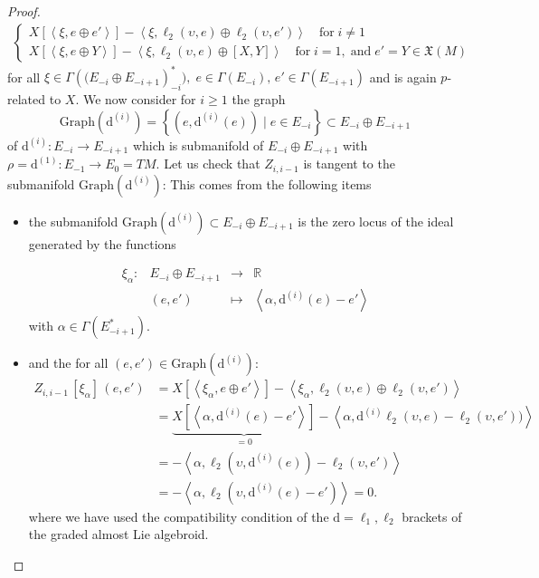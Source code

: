 \documentclass[10pt]{article}
\theoremstyle{plain}
\theoremstyle{definition}
\theoremstyle{remark}
\newcommand{\dd}{\mathrm{d}}
\begin{document}
\begin{proof}
\begin{align*}
\begin{cases}
        X[\left\langle \xi ,e\oplus e'\right\rangle]-\left\langle \xi, \ell_{2}(\upsilon,e)\oplus \ell_{2}(\upsilon,e') \right\rangle\quad \text{for}\; i\neq 1\\ X[\left\langle \xi ,e\oplus Y\right\rangle]-\left\langle \xi, \ell_{2}(\upsilon,e)\oplus [X,Y] \right\rangle\quad \text{for}\; i= 1, \; \text{and}\; e'=Y\in\mathfrak X(M)
    \end{cases}
 \end{align*}for all $\xi\in \Gamma\left((E_{-i}\oplus E_{-i+1}\right)^*_{-i}),\;e\in\Gamma(E_{-i}),\, e'\in\Gamma(E_{-i+1})$ and is again $p$-related to $X$. We now consider for $i\geq 1$ the graph $$\mathrm{Graph}(\dd^{(i)})=\displaystyle{\left\{\left(e, \dd^{(i)}(e)\right) \mid e \in E_{-i}\right\} \subset E_{-i} \oplus E_{-i+1}}$$ of $\dd^{(i)} \colon E_{-i}\to E_{-i+1}$ which is  submanifold of $E_{-i} \oplus E_{-i+1}$ with $\rho=\dd^{(1)}\colon E_{-1}\to E_0=TM$. Let us check that $Z_{i,i-1}$ is tangent to the submanifold $\mathrm{Graph}(\dd^{(i)})$:  This comes from the following items 
\begin{itemize}
     \item[-]  the submanifold $\mathrm{Graph}(\dd^{(i)})\subset E_{-i} \oplus E_{-i+1}$ is the zero locus of the ideal generated by the functions

 $$\begin{array}{rrcl} \xi_\alpha \colon & E_{-i} \oplus E_{-i+1} & \to &  \mathbb R \\& (e,e') & \mapsto & \left\langle\alpha, \dd^{(i)}(e)-e'\right\rangle  \end{array}
 $$
with $ \alpha \in \Gamma(E_{-i+1}^*)$.
     \item[-]  and the for all $(e,e')\in \mathrm{Graph}(\dd^{(i)})$:
 \begin{align*}\nonumber
     Z_{i,i-1}\, [\xi_\alpha ] \, (e,e')&=X[\left\langle \xi_\alpha ,e\oplus e'\right\rangle]-\left\langle \xi_\alpha, \ell_{2}(\upsilon,e)\oplus \ell_{2}(\upsilon,e') \right\rangle\\ &=\underbrace{X[\left\langle \alpha, \dd^{(i)}(e)-e'\right\rangle]}_{=0}-\left\langle \alpha, \dd^{(i)}\ell_2(\upsilon,e)-\ell_2(\upsilon,e'))\right\rangle\\\nonumber&=-\left\langle\alpha, \ell_2\left(\upsilon,\dd^{(i)}(e)\right)-\ell_2(\upsilon,e')\right\rangle\\\nonumber&=-\left\langle\alpha, \ell_2\left(\upsilon,\dd^{(i)}(e)-e'\right)\right\rangle=0.
     \end{align*}where we have used the compatibility condition of the $\dd=\ell_1,\ell_2$ brackets of the graded almost Lie algebroid.
 \end{itemize}
 

\end{proof}
\end{document}
